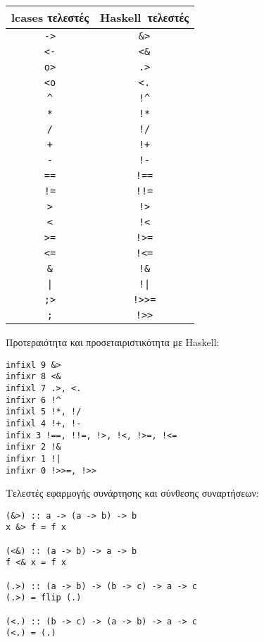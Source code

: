 \documentclass[diploma]{softlab-thesis}
\def\H{Haskell}
\begin{document}
\begin{table}[ht]
\hspace{0.5cm}
\begin{minipage}{0.45\linewidth}\centering
\begin{tabular}{ |c|c| }
\hline
lcases τελεστές & \H\ τελεστές
\\
\hline
\hline
\verb|->| & \verb|&>|
\\
\hline
\verb|<-| & \verb|<&|
\\
\hline
\verb|o>| & \verb|.>|
\\
\hline
\verb|<o| & \verb|<.|
\\
\hline
\verb|^| & \verb|!^|
\\
\hline
\verb|*| & \verb|!*|
\\
\hline
\verb|/| & \verb|!/|
\\
\hline
\verb|+| & \verb|!+|
\\
\hline
\verb|-| & \verb|!-|
\\
\hline
\verb|==| & \verb|!==|
\\
\hline
\verb|!=| & \verb|!!=|
\\
\hline
\verb|>| & \verb|!>|
\\
\hline
\verb|<| & \verb|!<|
\\
\hline
\verb|>=| & \verb|!>=|
\\
\hline
\verb|<=| & \verb|!<=|
\\
\hline
\verb|&| & \verb|!&|
\\
\hline
\texttt{|} & \texttt{!|}
\\
\hline
\verb|;>| & \verb|!>>=|
\\
\hline
\verb|;| & \verb|!>>|
\\
\hline
\end{tabular}
\end{minipage}
\hspace{1cm}
\begin{minipage}{0.45\linewidth}

Προτεραιότητα και προσεταιριστικότητα με \H:
\begin{verbatim}
infixl 9 &>
infixr 8 <&
infixl 7 .>, <.
infixr 6 !^
infixl 5 !*, !/
infixl 4 !+, !-
infix 3 !==, !!=, !>, !<, !>=, !<=
infixr 2 !&
infixr 1 !|
infixr 0 !>>=, !>>
\end{verbatim}

Τελεστές εφαρμογής συνάρτησης και σύνθεσης συναρτήσεων:
\begin{verbatim}
(&>) :: a -> (a -> b) -> b
x &> f = f x

(<&) :: (a -> b) -> a -> b
f <& x = f x

(.>) :: (a -> b) -> (b -> c) -> a -> c
(.>) = flip (.)

(<.) :: (b -> c) -> (a -> b) -> a -> c
(<.) = (.)
\end{verbatim}
\end{minipage}
\end{table}
\newpage
\end{document}
